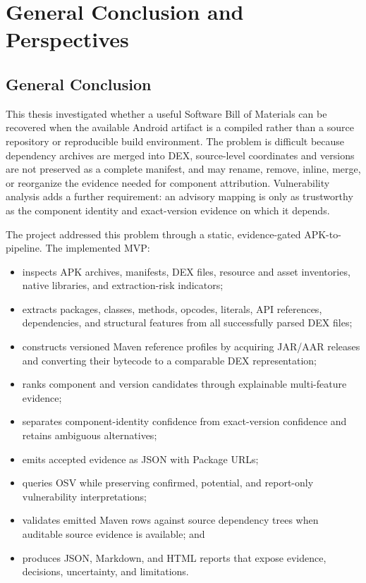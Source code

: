 \chapter{General Conclusion and Perspectives}
\label{ch:pfe-conclusion}

\section{General Conclusion}

This thesis investigated whether a useful Software Bill of Materials can be
recovered when the available Android artifact is a compiled \APK rather than a
source repository or reproducible build environment. The problem is difficult
because dependency archives are merged into DEX, source-level coordinates and
versions are not preserved as a complete manifest, and \Reight may rename,
remove, inline, merge, or reorganize the evidence needed for component
attribution. Vulnerability analysis adds a further requirement: an advisory
mapping is only as trustworthy as the component identity and exact-version
evidence on which it depends.

The project addressed this problem through a static, evidence-gated
APK-to-\SBOM pipeline. The implemented MVP:

\begin{itemize}
  \item inspects APK archives, manifests, DEX files, resource and asset
  inventories, native libraries, and extraction-risk indicators;
  \item extracts packages, classes, methods, opcodes, literals, API
  references, dependencies, and structural features from all successfully
  parsed DEX files;
  \item constructs versioned Maven reference profiles by acquiring JAR/AAR
  releases and converting their bytecode to a comparable DEX representation;
  \item ranks component and version candidates through explainable
  multi-feature evidence;
  \item separates component-identity confidence from exact-version confidence
  and retains ambiguous alternatives;
  \item emits accepted evidence as \CycloneDX JSON with Package URLs;
  \item queries OSV while preserving confirmed, potential, and report-only
  vulnerability interpretations;
  \item validates emitted Maven rows against source dependency trees when
  auditable source evidence is available; and
  \item produces JSON, Markdown, and HTML reports that expose evidence,
  decisions, uncertainty, and limitations.
\end{itemize}

